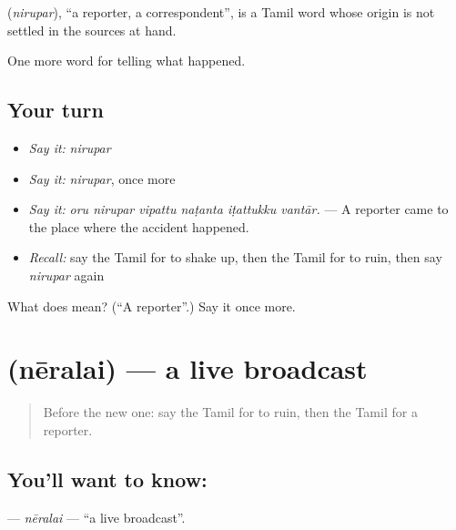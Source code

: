 \begin{cousinweb}
\textbf{} (\emph{nirupar}), \textquotedblleft{}a reporter, a correspondent\textquotedblright{}, is a Tamil word whose origin is not settled in the sources at hand.
\end{cousinweb}

\begin{grammarlens}[title={What you've built}]
One more word for telling what happened.
\end{grammarlens}

\subsection*{Your turn}
\begin{itemize}
\raggedright
  \item \emph{Say it:} \emph{nirupar}
  \item \emph{Say it:} \emph{nirupar}, once more
  \item \emph{Say it:} \emph{oru nirupar vipattu naṭanta iṭattukku vantār.} — A reporter came to the place where the accident happened.
  \item \emph{Recall:} say the Tamil for to shake up, then the Tamil for to ruin, then say \emph{nirupar} again
\end{itemize}

\begin{tcolorbox}[breakable,colback=teal!4,colframe=teal!35!black,title={Before you move on}]
What does  mean? (\textquotedblleft{}A reporter\textquotedblright{}.) Say it once more.
\end{tcolorbox}
\section[\texorpdfstring{\ta{நேரலை} (nēralai)}{நேரலை (nēralai)}]{ (nēralai) — a live broadcast}

\label{lesson:TA-C305-neralai}



\begin{quote}
Before the new one: say the Tamil for to ruin, then the Tamil for a reporter.
\end{quote}

\subsection*{You'll want to know: }
\textbf{} — \emph{nēralai} — \textquotedblleft{}a live broadcast\textquotedblright{}.


